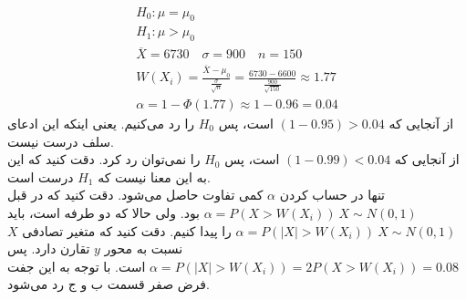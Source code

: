 \\
\begin{gather*}
    H_0: \mu = \mu_0\\
    H_1: \mu > \mu_0\\
    \overline{X} = 6730 \quad \sigma = 900 \quad n = 150\\
    W(X_i) = \frac{\overline{X}-\mu_0}{\frac{\sigma}{\sqrt{n}}} = \frac{6730 - 6600}{\frac{900}{\sqrt{150}}} \approx 1.77\\
    \alpha = 1 - \Phi(1.77) \approx 1 - 0.96 = 0.04
\end{gather*}
از آنجایی که
$(1 - 0.95) > 0.04$
است، پس
$H_0$
را رد می‌کنیم. یعنی اینکه این ادعای سلف درست نیست.
\\
از آنجایی که
$(1 - 0.99) < 0.04$
است، پس
$H_0$
را نمی‌توان رد کرد. دقت کنید که این به این معنا نیست که
$H_1$
درست است. 
\\
تنها در حساب کردن
$\alpha$
کمی تفاوت حاصل می‌شود. دقت کنید که در قبل
$\alpha = P(X > W(X_i)) ~ X \sim N(0, 1)$
بود. ولی حالا که دو طرفه است، باید
$\alpha = P(|X| > W(X_i)) ~ X \sim N(0, 1)$
را پیدا کنیم. دقت کنید که متغیر تصادفی
$X$
نسبت به محور
$y$
تقارن دارد. پس 
$\alpha = P(|X| > W(X_i)) = 2P(X > W(X_i)) = 0.08$
است. با توجه به این
جفت فرض صفر قسمت ب و ج رد می‌شود.




